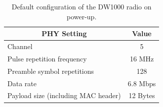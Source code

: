 \documentclass[journal,comsoc]{IEEEtran}
\begin{document}
\begin{table}[h!]
	\centering	
	\vspace{-2.5mm}
	\begin{tabular}{|l| c|} 
		\hline
		\multicolumn{1}{|c|}{\textbf{PHY Setting}}                    & \textbf{Value}  \\ \hline
		Channel                      & 5          \\ \hline
		Pulse repetition frequency   & 16 MHz               \\ \hline
		Preamble symbol repetitions	 & 128                 \\ \hline
		Data rate                    & 6.8 Mbps             \\ \hline
		Payload size (including MAC header)	             & 12 Bytes              \\ \hline
	\end{tabular} 
	\caption{Default configuration of the DW1000 radio on power-up.}
	\label{tab:default_settings}
	\vspace{-3.00mm}
\end{table}

%
%
\end{document}
